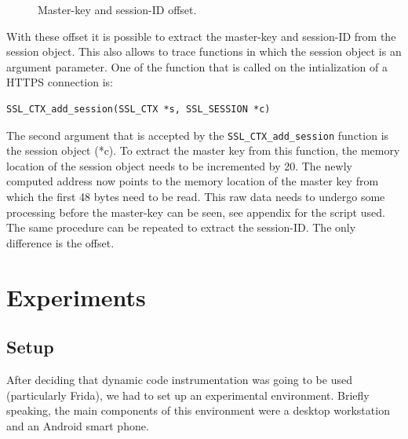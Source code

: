 \documentclass[12pt, a4paper]{report}
\begin{document}
\begin{figure}[!h]
\centering
{}
\caption{Master-key and session-ID offset.}
\end{figure}
\noindent With these offset it is possible to extract the master-key and session-ID from the session object. This also allows to trace functions in which the session object is an argument parameter. 
\newline
\newline
One of the function that is called on the intialization of a HTTPS connection is:
\begin{lstlisting}[frame=single, breaklines=true]
SSL_CTX_add_session(SSL_CTX *s, SSL_SESSION *c)
\end{lstlisting}
The second argument that is accepted by the \texttt{SSL\_CTX\_add\_session} function is the session object (*c). To extract the master key from this function, the memory location of the session object needs to be incremented by 20. The newly computed address now points to the memory location of the master key from which the first 48 bytes need to be read. This raw data needs to undergo some processing before the master-key can be seen, see appendix for the script used. The same procedure can be repeated to extract the session-ID. The only difference is the offset. 


\chapter{Experiments}
\section{Setup}

After deciding that dynamic code instrumentation was going to be used (particularly Frida), we had to set up an experimental environment. Briefly speaking, the main components of this environment were a desktop workstation and an Android smart phone.  
\end{document}
